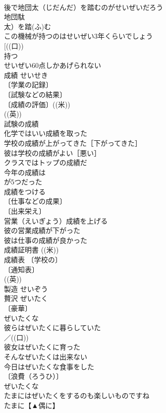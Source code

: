 \documentclass[8pt]{extreport}
\begin{document}
\begin{CJK}{UTF8}{min}
\\	後で地団太（じだんだ）を踏むのがせいぜいだろう 
\\	地団駄
\\	太）を踏(ふ)む 
\\	この機械が持つのはせいぜい3年くらいでしょう 
\\	[((口))
\\	持つ　
\\	せいぜい60点しかあげられない 
\\	成績	せいせき	
\\	〔学業の記録〕
\\	〔試験などの結果〕
\\	〔成績の評価〕((米)) 
\\	((英)) 
\\	試験の成績 
\\	化学ではいい成績を取った 
\\	学校の成績が上がってきた［下がってきた］ 
\\	彼は学校の成績がよい［悪い］ 
\\	クラスではトップの成績だ 
\\	今年の成績は
\\	が5つだった 
\\	成績をつける 
\\	〔仕事などの成果〕
\\	〔出来栄え〕
\\	営業（えいぎょう）成績を上げる 
\\	彼の営業成績が下がった 
\\	彼は仕事の成績が良かった 
\\	成績証明書 ((米)) 
\\	成績表 〔学校の〕
\\	〔通知表〕
\\	((英)) 
\\	製造	せいぞう	
\\	贅沢	ぜいたく	
\\	〔豪華〕
\\	ぜいたくな 
\\	彼らはぜいたくに暮らしていた 
\\	／((口)) 
\\	彼女はぜいたくに育った 
\\	そんなぜいたくは出来ない 
\\	今日はぜいたくな食事をした 
\\	〔浪費（ろうひ）〕
\\	ぜいたくな 
\\	たまにはぜいたくをするのも楽しいものですね 
\\	たまに【▲偶に】　

\end{CJK}
\end{document}
